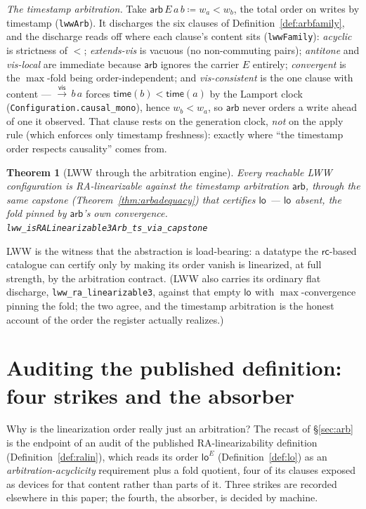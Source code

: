 \documentclass[11pt]{article}
\newtheorem{theorem}{Theorem}[section]
\newcommand{\vis}{\xrightarrow{\mathsf{vis}}}
\newcommand{\rcrel}{\mathsf{rc}}                 %
\newcommand{\loE}[1]{\mathsf{lo}^{#1}}
\newcommand{\lean}[1]{\texttt{#1}}
\newcommand{\arb}{\mathsf{arb}}
\begin{document}
\emph{The timestamp arbitration.} Take
$\arb\,E\,a\,b \coloneqq w_a < w_b$, the total order on writes by timestamp
(\lean{lwwArb}). It discharges the six clauses of
Definition~\ref{def:arbfamily}, and the discharge reads off where each
clause's content sits (\lean{lwwFamily}): \emph{acyclic} is strictness of
$<$; \emph{extends-vis} is vacuous (no non-commuting pairs);
\emph{antitone} and \emph{vis-local} are immediate because $\arb$ ignores
the carrier $E$ entirely; \emph{convergent} is the $\max$-fold being
order-independent; and \emph{vis-consistent} is the one clause with
content --- $\vis\,b\,a$ forces $\mathsf{time}(b) < \mathsf{time}(a)$ by
the Lamport clock (\lean{Configuration.causal\_mono}), hence $w_b < w_a$,
so $\arb$ never orders a write ahead of one it observed. That clause rests
on the generation clock, \emph{not} on the apply rule (which enforces only
timestamp freshness): exactly where ``the timestamp order respects
causality'' comes from.

\begin{theorem}[LWW through the arbitration engine]
\label{thm:lww}
Every reachable LWW configuration is RA-linearizable against the timestamp
arbitration $\arb$, through the \emph{same} capstone
(Theorem~\ref{thm:arbadequacy}) that certifies $\loE{}$ --- $\loE{}$
absent, the fold pinned by $\arb$'s own convergence.
\hfill\lean{lww\_isRALinearizable3Arb\_ts\_via\_capstone}
\end{theorem}

LWW is the witness that the abstraction is load-bearing: a datatype the
$\rcrel$-based catalogue can certify only by making its order vanish is
linearized, at full strength, by the arbitration contract. (LWW also
carries its ordinary flat discharge, \lean{lww\_ra\_linearizable3}, against
that empty $\loE{}$ with $\max$-convergence pinning the fold; the two
agree, and the timestamp arbitration is the honest account of the order the
register actually realizes.)

\section{Auditing the published definition: four strikes and the absorber}
\label{sec:audit}

Why is the linearization order really just an arbitration? The recast of
\S\ref{sec:arb} is the endpoint of an audit of the published
RA-linearizability definition (Definition~\ref{def:ralin}), which reads its
order $\loE{E}$ (Definition~\ref{def:lo}) as an
\emph{arbitration-acyclicity} requirement plus a fold quotient, four of its
clauses exposed as devices for that content rather than parts of it. Three
strikes are recorded elsewhere in this paper; the fourth, the absorber, is
decided by machine.
\end{document}
